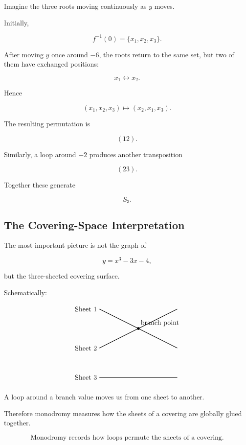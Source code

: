 \documentclass[12pt,a4paper]{article}
\theoremstyle{notespace}
\begin{document}
Imagine the three roots moving continuously as \(y\) moves.

Initially,

\[
f^{-1}(0)
=
\{x_1,x_2,x_3\}.
\]

After moving \(y\) once around \(-6\), the roots return to the same set,
but two of them have exchanged positions:

\[
x_1
\leftrightarrow
x_2.
\]

Hence

\[
(x_1,x_2,x_3)
\longmapsto
(x_2,x_1,x_3).
\]

The resulting permutation is

\[
(12).
\]

Similarly, a loop around \(-2\) produces another transposition

\[
(23).
\]

Together these generate

\[
S_3.
\]

\subsection{The Covering-Space Interpretation}

The most important picture is not the graph of

\[
y=x^3-3x-4,
\]

but the three-sheeted covering surface.

Schematically:

\[
\begin{tikzpicture}[scale=1]
	
	\draw[thick] (-2,1) -- (0,0);
	\draw[thick] (-2,-1) -- (0,0);
	
	\draw[thick] (0,0) -- (2,1);
	\draw[thick] (0,0) -- (2,-1);
	
	\draw[thick] (-2,-2.5) -- (2,-2.5);
	
	\fill (0,0) circle (2pt);
	
	\node[left] at (-2,1) {Sheet 1};
	\node[left] at (-2,-1) {Sheet 2};
	\node[left] at (-2,-2.5) {Sheet 3};
	
	\node[above right] at (0,0) {branch point};
	
\end{tikzpicture}
\]

A loop around a branch value moves us from one sheet to another.

Therefore monodromy measures how the sheets of a covering are globally
glued together.

\[
\boxed{
	\text{Monodromy records how loops permute the sheets of a covering.}
}
\]
\end{document}
